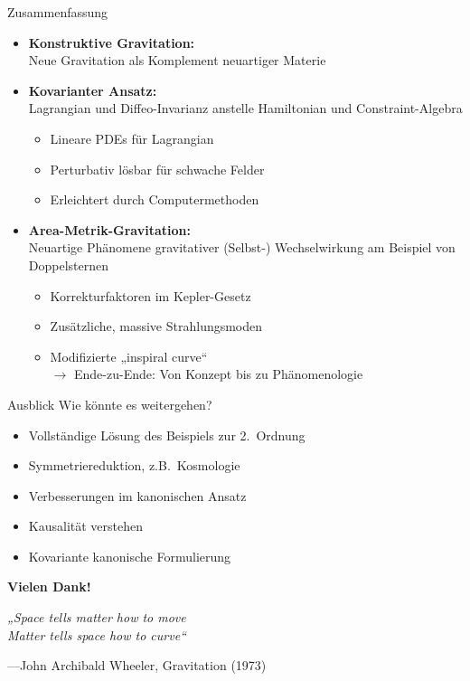 \documentclass{beamer}
\begin{document}
    \begin{frame}{Zusammenfassung}
        \begin{itemize}
            \item \textbf{Konstruktive Gravitation:} \\ Neue Gravitation als Komplement neuartiger Materie \pause
            \item \textbf{Kovarianter Ansatz:} \\
            Lagrangian und Diffeo-Invarianz anstelle Hamiltonian und Constraint-Algebra
            \begin{itemize}
                \item Lineare PDEs für Lagrangian
                \item Perturbativ lösbar für schwache Felder
                \item Erleichtert durch Computermethoden
            \end{itemize} \pause
            \item \textbf{Area-Metrik-Gravitation:} \\
            Neuartige Phänomene gravitativer (Selbst-) Wechselwirkung am Beispiel von Doppelsternen
            \begin{itemize}
                \item Korrekturfaktoren im Kepler-Gesetz
                \item Zusätzliche, massive Strahlungsmoden
                \item Modifizierte „inspiral curve“ \pause \\
                \alert{$\rightarrow$ Ende-zu-Ende: Von Konzept bis zu Phänomenologie}
            \end{itemize}
        \end{itemize}
    \end{frame}

    \begin{frame}{Ausblick}
        Wie könnte es weitergehen?
        \begin{itemize}
            \item Vollständige Lösung des Beispiels zur 2.\ Ordnung
            \item Symmetriereduktion, z.B.\ Kosmologie
            \item Verbesserungen im kanonischen Ansatz
            \item Kausalität verstehen
            \item Kovariante kanonische Formulierung
        \end{itemize}
    \end{frame}

    \begin{frame}{}

        \begin{center}
            \Huge\alert{\textbf{Vielen Dank!}}
        \end{center}

        \Large
        \textit{„Space tells matter how to move \\
        Matter tells space how to curve“}

        \normalsize
        ---John Archibald Wheeler, Gravitation (1973)
    \end{frame}
\end{document}
